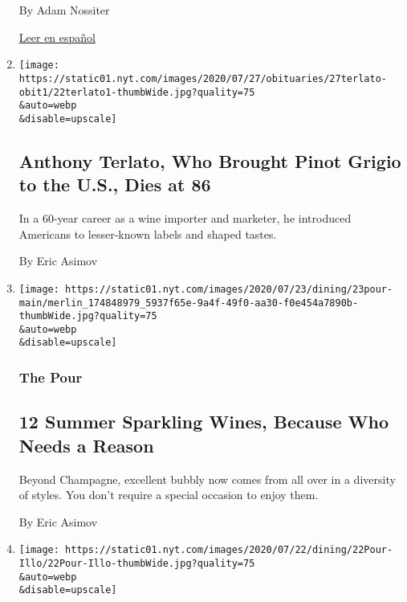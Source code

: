 \begin{enumerate}
  By Adam Nossiter

  \href{https://www.nytimes.com/es/2020/07/28/espanol/mundo/vino-blanco-alsacia-coronavirus.html}{Leer
  en español}
\item
  \href{/2020/07/23/dining/drinks/anthony-terlato-dead.html}{}

  \texttt{[image: https://static01.nyt.com/images/2020/07/27/obituaries/27terlato-obit1/22terlato1-thumbWide.jpg?quality=75\\\&auto=webp\\\&disable=upscale]}

  \hypertarget{anthony-terlato-who-brought-pinot-grigio-to-the-us-dies-at-86}{%
  \subsection{Anthony Terlato, Who Brought Pinot Grigio to the U.S.,
  Dies at
  86}\label{anthony-terlato-who-brought-pinot-grigio-to-the-us-dies-at-86}}

  In a 60-year career as a wine importer and marketer, he introduced
  Americans to lesser-known labels and shaped tastes.

  By Eric Asimov
\item
  \href{/2020/07/23/dining/drinks/best-sparkling-wines.html}{}

  \texttt{[image: https://static01.nyt.com/images/2020/07/23/dining/23pour-main/merlin\_174848979\_5937f65e-9a4f-49f0-aa30-f0e454a7890b-thumbWide.jpg?quality=75\\\&auto=webp\\\&disable=upscale]}

  \hypertarget{the-pour-3}{%
  \subsubsection{The Pour}\label{the-pour-3}}

  \hypertarget{12-summer-sparkling-wines-because-who-needs-a-reason}{%
  \subsection{12 Summer Sparkling Wines, Because Who Needs a
  Reason}\label{12-summer-sparkling-wines-because-who-needs-a-reason}}

  Beyond Champagne, excellent bubbly now comes from all over in a
  diversity of styles. You don't require a special occasion to enjoy
  them.

  By Eric Asimov
\item
  \href{/2020/07/20/dining/drinks/wine-vineyard-viticulture-farming.html}{}

  \texttt{[image: https://static01.nyt.com/images/2020/07/22/dining/22Pour-Illo/22Pour-Illo-thumbWide.jpg?quality=75\\\&auto=webp\\\&disable=upscale]}


\end{enumerate}
